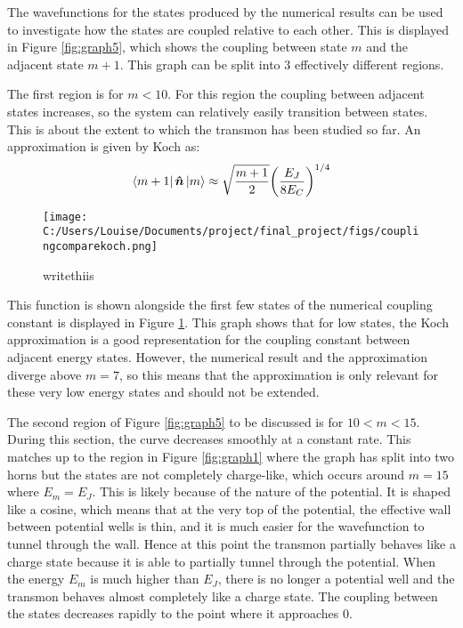\documentclass[11pt]{article}
\begin{document}
The wavefunctions for the states produced by the numerical results can be used to investigate how the states are coupled relative to each other. This is displayed in Figure \ref{fig:graph5}, which shows the coupling between state $m$ and the adjacent state $m+1$. This graph can be split into 3 effectively different regions.

The first region is for $m<10$. For this region the coupling between adjacent states increases, so the system can relatively easily transition between states. This is about the extent to which the transmon has been studied so far. An approximation is given by Koch as:
\begin{equation} \label{eq:10}
\bra{m+1}\boldsymbol{\hat{n}}\ket{m} \approx \sqrt{\frac{m+1}{2}} \bigg( \frac{E_J}{8E_C}\bigg)^{1/4}
\end{equation}
\begin{figure}[ht]
\centering
\texttt{[image: C:/Users/Louise/Documents/project/final\_project/figs/couplingcomparekoch.png]}
\caption{writethiis}
\label{fig:graph7}
\end{figure}
This function is shown alongside the first few states of the numerical coupling constant is displayed in Figure \ref{fig:graph7}. This graph shows that for low states, the Koch approximation is a good representation for the coupling constant between adjacent energy states. However, the numerical result and the approximation diverge above $m=7$, so this means that the approximation is only relevant for these very low energy states and should not be extended.

The second region of Figure \ref{fig:graph5} to be discussed is for $10<m<15$. During this section, the curve decreases smoothly at a constant rate. This matches up to the region in Figure \ref{fig:graph1} where the graph has split into two horns but the states are not completely charge-like, which occurs around $m=15$ where $E_m = E_J$. This is likely because of the nature of the potential. It is shaped like a cosine, which means that at the very top of the potential, the effective wall between potential wells is thin, and it is much easier for the wavefunction to tunnel through the wall. Hence at this point the transmon partially behaves like a charge state because it is able to partially tunnel through the potential. When the energy $E_m$ is much higher than $E_J$, there is no longer a potential well and the transmon behaves almost completely like a charge state. The coupling between the states decreases rapidly to the point where it approaches 0.
\end{document}
